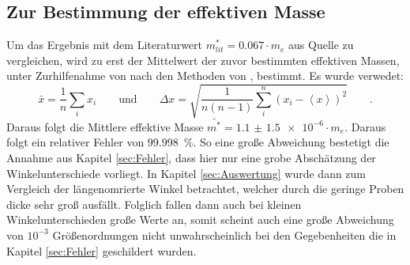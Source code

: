 \subsection{Zur Bestimmung der effektiven Masse} 
Um das Ergebnis mit dem Literaturwert $ m_{lit} ^* = 0.067 \cdot m_e$ aus Quelle \cite{effm} zu 
vergleichen, wird zu erst der Mittelwert der zuvor bestimmten effektiven Massen, unter Zurhilfenahme 
von \cite{numpy} nach den Methoden von \cite{Tipler}, bestimmt. Es wurde verwedet:
\begin{equation*}
\bar{x} = \frac{1}{n} \sum_i x_i \qquad \text{und} \qquad 
\Delta x = \sqrt{\frac{1}{n\left(n-1\right)} \sum_i ^n \left( x_i-\left<x\right>\right)^2 } \qquad . 
\end{equation*}
Daraus folgt die Mittlere effektive Masse $\bar{m^*} = \SI{1.1(15)e-6} \cdot m_e$. Daraus folgt ein 
relativer Fehler von \SI{99.998}{\percent}. So eine große Abweichung bestetigt die Annahme aus 
Kapitel \ref{sec:Fehler}, dass hier nur eine grobe Abschätzung der Winkelunterschiede vorliegt. 
In Kapitel \ref{sec:Auswertung} wurde dann zum Vergleich der längenomrierte Winkel betrachtet, 
welcher durch die geringe Proben dicke sehr groß ausfällt. Folglich fallen dann auch bei kleinen 
Winkelunterschieden große Werte an, somit scheint  auch eine große Abweichung von $ 10^{-3}$ 
Größenordnungen nicht unwahrscheinlich bei den Gegebenheiten die in Kapitel \ref{sec:Fehler} 
geschildert wurden. 
